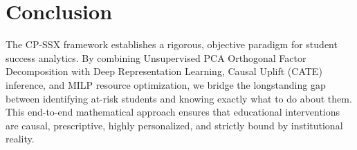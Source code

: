\documentclass[11pt, a4paper]{article}
\begin{document}
\section{Conclusion}
The CP-SSX framework establishes a rigorous, objective paradigm for student success analytics. By combining Unsupervised PCA Orthogonal Factor Decomposition with Deep Representation Learning, Causal Uplift (CATE) inference, and MILP resource optimization, we bridge the longstanding gap between identifying at-risk students and knowing exactly what to do about them. This end-to-end mathematical approach ensures that educational interventions are causal, prescriptive, highly personalized, and strictly bound by institutional reality.



\end{document}

